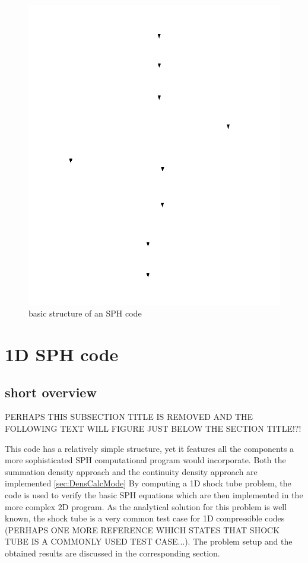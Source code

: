 \documentclass{report}
\begin{document}
\begin{figure}[h]
  \centering
      \includegraphics[width=1.0\textwidth]{Graphics/general_structure_SPH}
  \caption{basic structure of an SPH code}
  \label{fig:BasicSphCode}
\end{figure}

\section{1D SPH code}

\subsection{short overview}
PERHAPS THIS SUBSECTION TITLE IS REMOVED AND THE FOLLOWING TEXT WILL FIGURE JUST BELOW THE SECTION TITLE!?!

This code has a relatively simple structure, yet it features all the components a more sophisticated SPH computational program would incorporate. Both the summation density approach and the continuity density approach are implemented \ref{sec:DensCalcMode} By computing a 1D shock tube problem, the code is used to verify the basic SPH equations which are then implemented in the more complex 2D program. As the analytical solution for this problem is well known, the shock tube is a very common test case for 1D compressible codes \cite{Sod1978} (PERHAPS ONE MORE REFERENCE WHICH STATES THAT SHOCK TUBE IS A COMMONLY USED TEST CASE...). The problem setup and the obtained results are discussed in the corresponding section.
\end{document}
